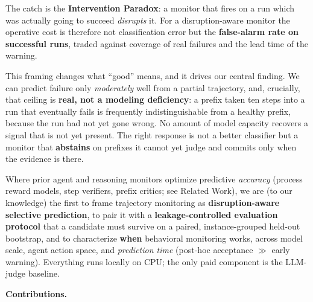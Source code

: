 The catch is the \textbf{Intervention Paradox}: a monitor that fires on a run which was actually going to succeed \emph{disrupts} it. For a disruption-aware monitor the operative cost is therefore not classification error but the \textbf{false-alarm rate on successful runs}, traded against coverage of real failures and the lead time of the warning.

This framing changes what ``good'' means, and it drives our central finding. We can predict failure only \emph{moderately} well from a partial trajectory, and, crucially, that ceiling is \textbf{real, not a modeling deficiency}: a prefix taken ten steps into a run that eventually fails is frequently indistinguishable from a healthy prefix, because the run had not yet gone wrong. No amount of model capacity recovers a signal that is not yet present. The right response is not a better classifier but a monitor that \textbf{abstains} on prefixes it cannot yet judge and commits only when the evidence is there.

Where prior agent and reasoning monitors optimize predictive \emph{accuracy} (process reward models, step verifiers, prefix critics; see Related Work), we are (to our knowledge) the first to frame trajectory monitoring as \textbf{disruption-aware selective prediction}, to pair it with a \textbf{leakage-controlled evaluation protocol} that a candidate must survive on a paired, instance-grouped held-out bootstrap, and to characterize \textbf{when} behavioral monitoring works, across model scale, agent action space, and \emph{prediction time} (post-hoc acceptance $\gg$ early warning). Everything runs locally on CPU; the only paid component is the LLM-judge baseline.

\textbf{Contributions.}

